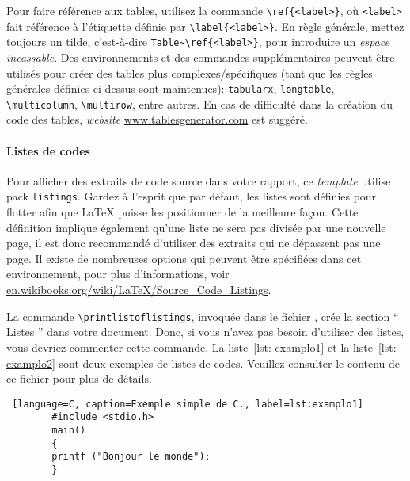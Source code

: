 Pour faire référence aux tables, utilisez la commande \verb|\ref{<label>}|, où \verb|<label>| fait référence à l'étiquette définie par \verb|\label{<label>}|. En règle générale, mettez toujours un tilde, c'est-à-dire \verb|Table~\ref{<label>}|, pour introduire un \textit{espace incassable}. Des environnements et des commandes supplémentaires peuvent être utilisés pour créer des tables plus complexes/spécifiques (tant que les règles générales définies ci-dessus sont maintenues): \verb|tabularx|, \verb|longtable|, \verb|\multicolumn|, \verb|\multirow|, entre autres. En cas de difficulté dans la création du code des tables, \textit{website} \url{www.tablesgenerator.com} est suggéré.


\paragraph{Listes de codes}

Pour afficher des extraits de code source dans votre rapport, ce \textit{template} utilise \gls{pack} \verb|listings|. Gardez à l'esprit que par défaut, les listes sont définies pour flotter afin que \LaTeX{} puisse les positionner de la meilleure façon. Cette définition implique également qu'une liste ne sera pas divisée par une nouvelle page, il est donc recommandé d'utiliser des extraits qui ne dépassent pas une page. Il existe de nombreuses options qui peuvent être spécifiées dans cet environnement, pour plus d'informations, voir \url{en.wikibooks.org/wiki/LaTeX/Source_Code_Listings}.

La commande \verb|\printlistoflistings|, invoquée dans le fichier , crée la section `` Listes '' dans votre document. Donc, si vous n'avez pas besoin d'utiliser des listes, vous devriez commenter cette commande. La liste~\ref{lst: examplo1} et la liste~\ref{lst: examplo2} sont deux exemples de listes de codes. Veuillez consulter le contenu de ce fichier pour plus de détails.

\begin{center}
    \begin{minipage}{0.7 \linewidth}
        \begin{lstlisting} [language=C, caption=Exemple simple de C., label=lst:examplo1]
        #include <stdio.h>
        main()
        {
        printf ("Bonjour le monde");
        }
        \end{lstlisting}
    \end{minipage}
\end{center}

